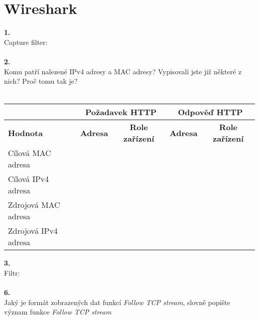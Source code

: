 \section{Wireshark}
\textbf{1.}\\
Capture filter:\\
\\
\textbf{2.}\\
Komu patří nalezené IPv4 adresy a MAC adresy? Vypisovali jste již některé z nich? Proč tomu tak je?\\
\\
\begin{tabular}{|l|c|c|c|c|}
\hline
& \multicolumn{2}{|c|}{\textbf{Požadavek HTTP}} & \multicolumn{2}{|c|}{\textbf{Odpověď HTTP}}\\
\hline
\textbf{Hodnota} & \textbf{Adresa} & \textbf{Role zařízení} & \textbf{Adresa} & \textbf{Role zařízení}\\
\hline
Cílová MAC adresa & \hspace{8em} & \hspace{6em} & \hspace{8em} & \hspace{6em} \\
\hline
Cílová IPv4 adresa & & & & \\
\hline
Zdrojová MAC adresa & & & & \\
\hline
Zdrojová IPv4 adresa & & & & \\
\hline
\end{tabular}
\vspace{2em}

\textbf{3.}\\
Filtr:\\
\\
\textbf{6.}\\
Jaký je formát zobrazených dat funkcí \emph{Follow TCP stream}, slovně popište
význam funkce \emph{Follow TCP stream}\\
